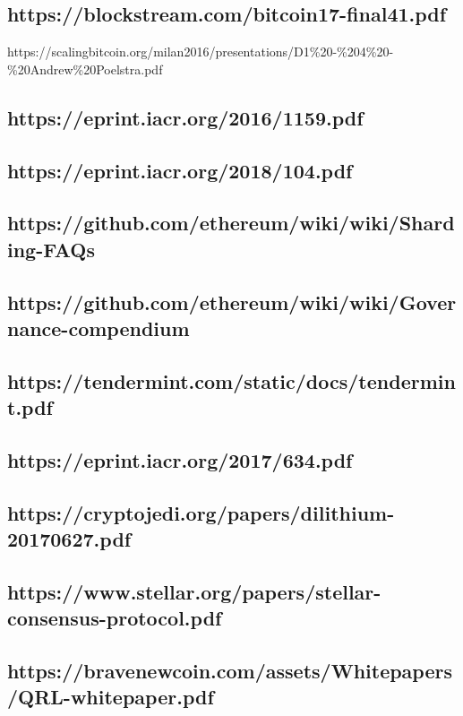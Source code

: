 \documentclass[11pt]{article}
\begin{document}
\subsection{https://blockstream.com/bitcoin17-final41.pdf}

https://scalingbitcoin.org/milan2016/presentations/D1\%20-\%204\%20-\%20Andrew\%20Poelstra.pdf


\subsection{https://eprint.iacr.org/2016/1159.pdf}

\subsection{https://eprint.iacr.org/2018/104.pdf}

\subsection{https://github.com/ethereum/wiki/wiki/Sharding-FAQs}

\subsection{https://github.com/ethereum/wiki/wiki/Governance-compendium}

\subsection{https://tendermint.com/static/docs/tendermint.pdf}

\subsection{https://eprint.iacr.org/2017/634.pdf}

\subsection{https://cryptojedi.org/papers/dilithium-20170627.pdf}

\subsection{https://www.stellar.org/papers/stellar-consensus-protocol.pdf}

\subsection{https://bravenewcoin.com/assets/Whitepapers/QRL-whitepaper.pdf}
\end{document}
